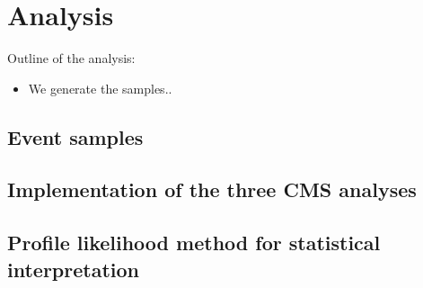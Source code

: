 \section{Analysis}

Outline of the analysis:

\begin{itemize}
\item We generate the samples..
\end{itemize}

\subsection{Event samples}

\subsection{Implementation of the three CMS analyses}

\subsection{Profile likelihood method for statistical interpretation}
